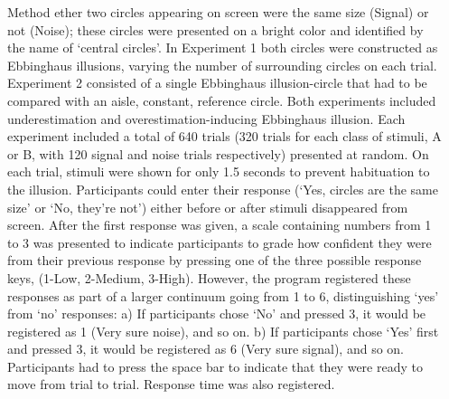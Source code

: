 \documentclass[final]{beamer}
\newlength{\onecolwid}
\newlength{\twocolwid}
\begin{document}
\begin{frame}[t]
\begin{columns}[t]
\begin{column}{\twocolwid}
\begin{columns}[t,totalwidth=\twocolwid]
\begin{column}{\onecolwid}
\begin{block}{Method}
ether two circles appearing on screen were the same size (Signal) or not (Noise); these circles were presented on a bright color and identified by the name of ‘central circles’. In Experiment 1 both circles were constructed as Ebbinghaus illusions, varying the number of surrounding circles on each trial.
Experiment 2 consisted of a single Ebbinghaus illusion-circle that had to be compared with an aisle, constant, reference circle. Both experiments included underestimation and overestimation-inducing Ebbinghaus illusion.
Each experiment included a total of 640 trials (320 trials for each class of stimuli, A or B, with 120 signal and noise trials respectively) presented at random. On each trial, stimuli were shown for only 1.5 seconds to prevent habituation to the illusion. Participants could enter their response (‘Yes, circles are the same size’ or ‘No, they’re not’) either before or after stimuli disappeared from screen.
After the first response was given, a scale containing numbers from 1 to 3 was presented to indicate participants to grade how confident they were from their previous response by pressing one of the three possible response keys, (1-Low, 2-Medium, 3-High). However, the program registered these responses as part of a larger continuum going from 1 to 6, distinguishing ‘yes’ from ‘no’ responses:
a) If participants chose ‘No’ and pressed 3, it would be registered as 1 (Very sure noise), and so on.
b) If participants chose ‘Yes’ first and pressed 3, it would be registered as 6 (Very sure signal), and so on.
Participants had to press the space bar to indicate that they were ready to move from trial to trial. Response time was also registered.



\end{block}


\end{column} %

\begin{column}{\onecolwid}\vspace{-.6in} %


\end{column}
\end{columns}
\end{column}
\end{columns}
\end{frame}
\end{document}
